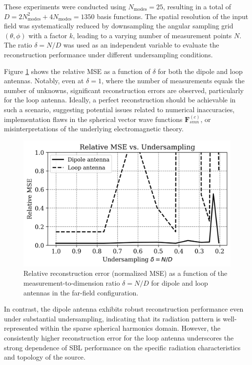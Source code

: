 \documentclass{article}
\begin{document}
These experiments were conducted using $N_{\text{modes}} = 25$, resulting in a total of $D = 2N_{\text{modes}}^2 + 4N_{\text{modes}} = 1350$ basis functions. The spatial resolution of the input field was systematically reduced by downsampling the angular sampling grid $(\theta, \phi)$ with a factor $k$, leading to a varying number of measurement points $N$. The ratio $\delta = N/D$ was used as an independent variable to evaluate the reconstruction performance under different undersampling conditions.

Figure \ref{fig:mse_ff} shows the relative MSE as a function of $\delta$ for both the dipole and loop antennas. Notably, even at $\delta=1$, where the number of measurements equals the number of unknowns, significant reconstruction errors are observed, particularly for the loop antenna. Ideally, a perfect reconstruction should be achievable in such a scenario, suggesting potential issues related to numerical inaccuracies, implementation flaws in the spherical vector wave functions $\mathbf{F}_{smn}^{(c)}$, or misinterpretations of the underlying electromagnetic theory.
\begin{figure}[H]
    \centering
    \includegraphics[width=0.75\linewidth]{Figures/delta_vs_mse_ff.png}
    \caption{Relative reconstruction error (normalized MSE) as a function of the measurement-to-dimension ratio $\delta = N/D$ for dipole and loop antennas in the far-field configuration.}
    \label{fig:mse_ff}
\end{figure}

In contrast, the dipole antenna exhibits robust reconstruction performance even under substantial undersampling, indicating that its radiation pattern is well-represented within the sparse spherical harmonics domain. However, the consistently higher reconstruction error for the loop antenna underscores the strong dependence of SBL performance on the specific radiation characteristics and topology of the source.
\end{document}
